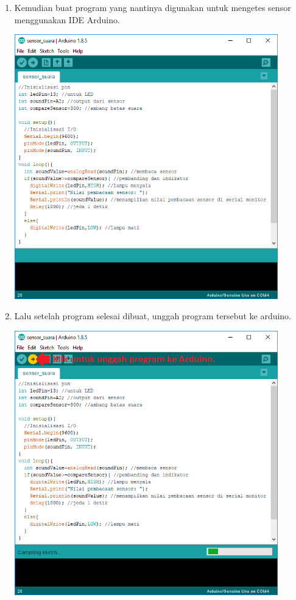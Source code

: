 \begin{enumerate}
\item  Kemudian buat program yang nantinya digunakan untuk mengetes sensor menggunakan IDE Arduino.
\break
\centerline{\includegraphics[width=0.9\textwidth]{figures/ss10.png}}
\item Lalu setelah program selesai dibuat, unggah program tersebut ke arduino.
\break
\centerline{\includegraphics[width=0.9\textwidth]{figures/ss11.png}}

\end{enumerate}
